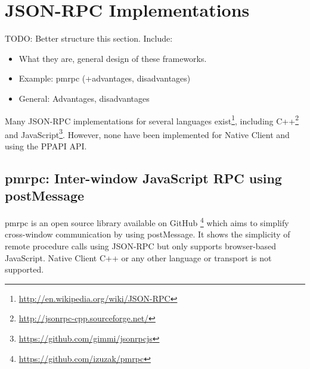 \section{JSON-RPC Implementations} %

TODO: Better structure this section. Include:
\begin{itemize}
	\item What they are, general design of these frameworks.
	\item Example: pmrpc (+advantages, disadvantages)
	\item General: Advantages, disadvantages
\end{itemize}

\label{sec:json_rpc_implementations}
Many JSON-RPC implementations for several languages exist\footnote{\url{http://en.wikipedia.org/wiki/JSON-RPC}}, including C++\footnote{\url{http://jsonrpc-cpp.sourceforge.net/}} and JavaScript\footnote{\url{https://github.com/gimmi/jsonrpcjs}}. However, none have been implemented for Native Client and using the PPAPI API.

\subsection{pmrpc: Inter-window JavaScript RPC using postMessage} %
\label{sub:pmrpc_json_rpc_using_postmessage}
pmrpc is an open source library available on GitHub \footnote{\url{https://github.com/izuzak/pmrpc}} which aims to simplify cross-window communication by using postMessage. It shows the simplicity of remote procedure calls using JSON-RPC but only supports browser-based JavaScript. Native Client C++ or any other language or transport is not supported.

